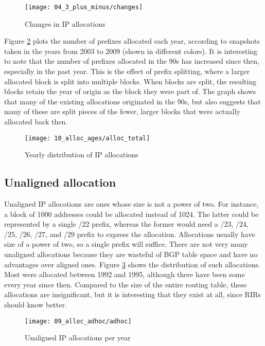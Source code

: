 \begin{figure}[htbp]
    \centering
        \texttt{[image: 04\_3\_plus\_minus/changes]}
    \caption{Changes in IP allocations}
    \label{fig:IP allocations new and gone}
\end{figure}

Figure \ref{fig:alloc ages total} plots the number of prefixes allocated each
year, according to snapshots taken in the years from 2003 to 2009 (shown in
different colors). It is interesting to note that the number of prefixes
allocated in the 90s has increased since then, especially in the past year.
This is the effect of prefix splitting, where a larger allocated block is
split into multiple blocks. When blocks are split, the resulting blocks retain
the year of origin as the block they were part of. The graph shows that many
of the existing allocations originated in the 90s, but also suggests that many
of these are split pieces of the fewer, larger blocks that were actually
allocated back then.

\begin{figure}[htbp]
	\centering
		\texttt{[image: 10\_alloc\_ages/alloc\_total]}
	\caption{Yearly distribution of IP allocations}
	\label{fig:alloc ages total}
\end{figure}

\subsection{Unaligned allocation}

Unaligned IP allocations are ones whose size is not a power of two. For
instance, a block of 1000 addresses could be allocated instead of 1024. The
latter could be represented by a single /22 prefix, whereas the former would
need a /23, /24, /25, /26, /27, and /29 prefix to express the allocation.
Allocations usually have size of a power of two, so a single prefix will
suffice. There are not very many unaligned allocations because they are
wasteful of BGP table space and have no advantages over aligned ones. Figure
\ref{fig:unaligned IP allocations} shows the distribution of such allocations.
Most were allocated between 1992 and 1995, although there have been some every
year since then. Compared to the size of the entire routing table, these
allocations are insignificant, but it is interesting that they exist at all,
since RIRs should know better.

\begin{figure}[htbp]
 	\centering
 		\texttt{[image: 09\_alloc\_adhoc/adhoc]}
	\caption{Unaligned IP allocations per year}
 	\label{fig:unaligned IP allocations}
\end{figure}


